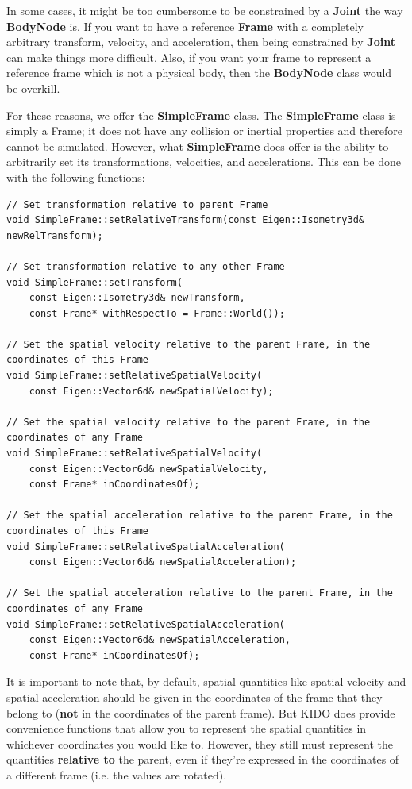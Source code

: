 In some cases, it might be too cumbersome to be constrained by a \textbf{Joint} the way \textbf{BodyNode} is. If you want to have a reference \textbf{Frame} with a completely arbitrary transform, velocity, and acceleration, then being constrained by \textbf{Joint} can make things more difficult. Also, if you want your frame to represent a reference frame which is not a physical body, then the \textbf{BodyNode} class would be overkill.

For these reasons, we offer the \textbf{SimpleFrame} class. The \textbf{SimpleFrame} class is simply a Frame; it does not have any collision or inertial properties and therefore cannot be simulated. However, what \textbf{SimpleFrame} does offer is the ability to arbitrarily set its transformations, velocities, and accelerations. This can be done with the following functions:

\begin{lstlisting}
// Set transformation relative to parent Frame
void SimpleFrame::setRelativeTransform(const Eigen::Isometry3d& newRelTransform);

// Set transformation relative to any other Frame
void SimpleFrame::setTransform(
    const Eigen::Isometry3d& newTransform,
    const Frame* withRespectTo = Frame::World());
    
// Set the spatial velocity relative to the parent Frame, in the coordinates of this Frame
void SimpleFrame::setRelativeSpatialVelocity(
    const Eigen::Vector6d& newSpatialVelocity);
    
// Set the spatial velocity relative to the parent Frame, in the coordinates of any Frame
void SimpleFrame::setRelativeSpatialVelocity(
    const Eigen::Vector6d& newSpatialVelocity,
    const Frame* inCoordinatesOf);
    
// Set the spatial acceleration relative to the parent Frame, in the coordinates of this Frame
void SimpleFrame::setRelativeSpatialAcceleration(
    const Eigen::Vector6d& newSpatialAcceleration);

// Set the spatial acceleration relative to the parent Frame, in the coordinates of any Frame
void SimpleFrame::setRelativeSpatialAcceleration(
    const Eigen::Vector6d& newSpatialAcceleration,
    const Frame* inCoordinatesOf);
\end{lstlisting}

It is important to note that, by default, spatial quantities like spatial velocity and spatial acceleration should be given in the coordinates of the frame that they belong to (\textbf{not} in the coordinates of the parent frame). But KIDO does provide convenience functions that allow you to represent the spatial quantities in whichever coordinates you would like to. However, they still must represent the quantities \textbf{relative to} the parent, even if they're expressed in the coordinates of a different frame (i.e. the values are rotated).

